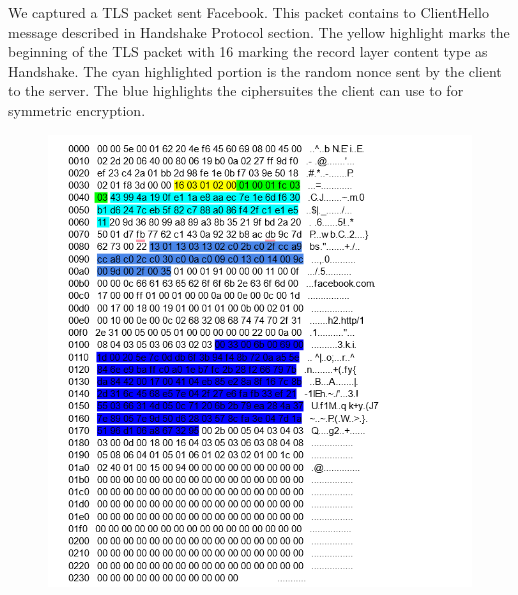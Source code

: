 We captured a TLS packet sent Facebook. This packet contains to ClientHello message described in Handshake Protocol section. The yellow highlight marks the beginning of the TLS packet with 16 marking the record layer content type as Handshake. The cyan highlighted portion is the random nonce sent by the client to the server. The blue highlights the ciphersuites the client can use to for symmetric encryption.
\begin{figure}[h!]
    \includegraphics*[width=\textwidth]{images/clientHello.png}
\end{figure}